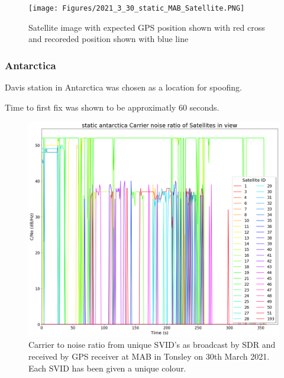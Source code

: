 \begin{figure}[h]
    \begin{centering}
        \texttt{[image: Figures/2021\_3\_30\_static\_MAB\_Satellite.PNG]}
        \caption{Satellite image with expected GPS position shown with red cross and recoreded position shown with blue line}
        \label{fig:MABSatelliteImage}
    \end{centering}
\end{figure}

\subsubsection{Antarctica}
Davis station in Antarctica was chosen as a location for spoofing. 

Time to first fix was shown to be approximatly 60 seconds.

\begin{figure}[h]
    \begin{centering}
        \includegraphics[width=14cm,keepaspectratio]{Figures/2021_3_30_static_antarctica Carrier noise ratio.png}
        \caption{Carrier to noise ratio from unique SVID's as broadcast by SDR and received by GPS receiver at MAB in Tonsley on 30th March 2021. Each SVID has been given a unique colour.}
        \label{fig:antarcticaStaticCNo}
    \end{centering}
\end{figure}

